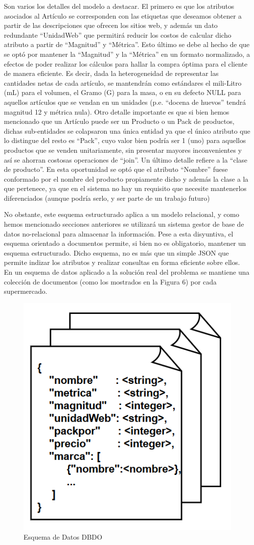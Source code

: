 \documentclass[12pt]{article} %
\begin{document}
Son varios los detalles del modelo a destacar. El primero es que los atributos asociados al Artículo se corresponden con las etiquetas que deseamos obtener a partir de las descripciones que ofrecen los sitios web, y además un dato redundante “UnidadWeb” que permitirá reducir los costos de calcular dicho atributo a partir de “Magnitud” y “Métrica”. Esto último se debe al hecho de que se optó por mantener la “Magnitud” y la “Métrica” en un formato normalizado, a efectos de poder realizar los cálculos para hallar la compra óptima para el cliente de manera eficiente. Es decir, dada la heterogeneidad de representar las cantidades netas de cada artículo, se mantendrán como estándares el mili-Litro (mL) para el volumen, el Gramo (G) para la masa, o en su defecto NULL para aquellos artículos que se vendan en un unidades (p.e. “docena de huevos” tendrá magnitud 12 y métrica nula). Otro detalle importante es que si bien hemos mencionado que un Artículo puede ser un Producto o un Pack de productos, dichas sub-entidades se colapsaron una única entidad ya que el único atributo que lo distingue del resto es “Pack”, cuyo valor bien podría ser 1 (uno) para aquellos productos que se venden unitariamente, sin presentar mayores inconvenientes y así se ahorran costosas operaciones de “join”. Un último detalle refiere a la “clase de producto”. En esta oportunidad se optó que el atributo “Nombre” fuese conformado por el nombre del producto propiamente dicho y además la clase a la que pertenece, ya que en el sistema no hay un requisito que necesite mantenerlos diferenciados (aunque podría serlo, y ser parte de un trabajo futuro)

No obstante, este esquema estructurado aplica a un modelo relacional, y como hemos mencionado secciones anteriores se utilizará un sistema gestor de base de datos no-relacional para almacenar la información. Pese a esta disyuntiva, el esquema orientado a documentos permite, si bien no es obligatorio, mantener un esquema estructurado. Dicho esquema, no es más que un simple JSON que permite indizar los atributos y realizar consultas en forma eficiente sobre ellos. En un esquema de datos aplicado a la solución real del problema se mantiene una colección de documentos (como los mostrados en la Figura 6) por cada supermercado.

\begin{figure}[H]
\includegraphics[height=0.30\textwidth]{documento}
\centering
\caption{Esquema de Datos DBDO}
\end{figure}
\end{document}
